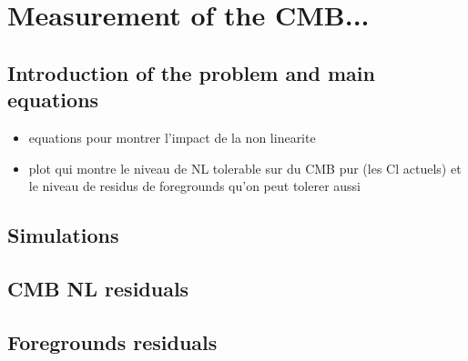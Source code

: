 
\section{Measurement of the CMB...}

\subsection{Introduction of the problem and main equations}
\begin{itemize}
\item equations pour montrer l'impact de la non linearite
\item plot qui montre le niveau de NL tolerable sur du CMB pur (les Cl actuels)
  et le niveau de residus de foregrounds qu'on peut tolerer aussi
\end{itemize}

\subsection{Simulations}
\subsection{CMB NL residuals}
\subsection{Foregrounds residuals}
